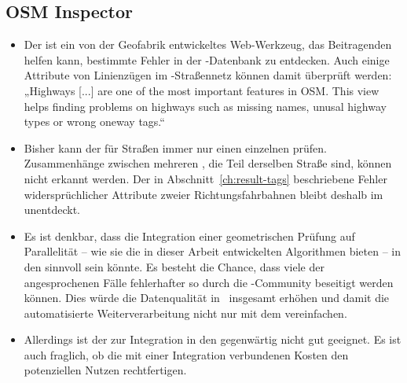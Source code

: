 \documentclass[../main/thesis.tex]{subfiles}
\begin{document}



\subsection{OSM Inspector}

\begin{itemize}

\item
Der  ist ein von der Geofabrik entwickeltes Web-Werkzeug, das Beitragenden helfen kann, bestimmte Fehler in der \osm-Datenbank zu entdecken.
Auch einige Attribute von Linienzügen im \osm-Straßennetz können damit überprüft werden:
„Highways [...] are one of the most important features in OSM.
This view helps finding problems on highways such as missing names, unusal highway types or wrong oneway tags.“

\item
Bisher kann der  für Straßen immer nur einen einzelnen  prüfen.
Zusammenhänge zwischen mehreren , die Teil derselben Straße sind, können nicht erkannt werden.
Der in Abschnitt~\ref{ch:result-tags} beschriebene Fehler widersprüchlicher Attribute zweier Richtungsfahrbahnen bleibt deshalb im  unentdeckt.

\item
Es ist denkbar, dass die Integration einer geometrischen Prüfung auf Parallelität -- wie sie die in dieser Arbeit entwickelten Algorithmen bieten -- in den  sinnvoll sein könnte.
Es besteht die Chance, dass viele der angesprochenen Fälle fehlerhafter  so durch die \osm-Community beseitigt werden können.
Dies würde die Datenqualität in \osm\ insgesamt erhöhen und damit die automatisierte Weiterverarbeitung nicht nur mit dem  vereinfachen.

\item
Allerdings ist der  zur Integration in den  gegenwärtig nicht gut geeignet.
Es ist auch fraglich, ob die mit einer Integration verbundenen Kosten den potenziellen Nutzen rechtfertigen.

\end{itemize}
\end{document}
